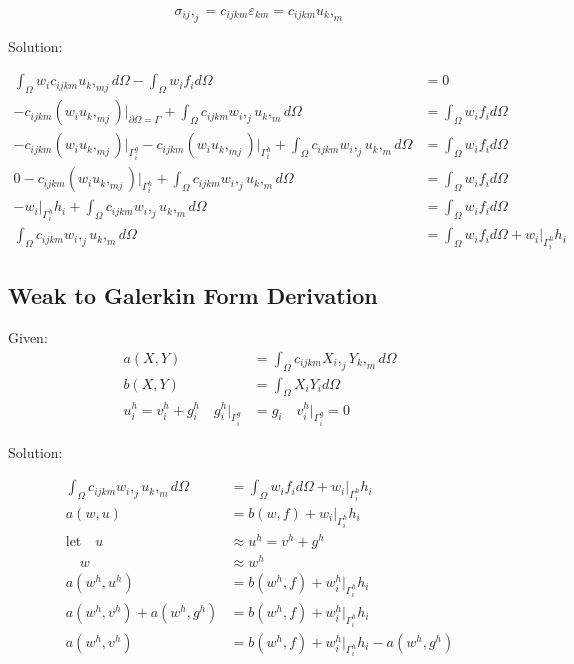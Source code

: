 \documentclass[a4paper, 12pt]{article}
\begin{document}
\begin{equation*}
\sigma_{ij},_{j} = c_{ijkm} \varepsilon_{km} = c_{ijkm} u_{k},_{m}
\end{equation*}

\noindent
Solution:

\begin{align*}
\int_{\Omega} w_{i} c_{ijkm} u_{k},_{mj} d\Omega -
  \int_{\Omega} w_{i} f_{i} d\Omega &= 0 \\
-c_{ijkm}(w_{i} u_{k},_{mj})\Big|_{\partial\Omega = \Gamma}
  + \int_{\Omega} c_{ijkm} w_{i},_{j} u_{k},_{m} d\Omega
  &=\int_{\Omega} w_{i} f_{i} d\Omega  \\
-c_{ijkm}(w_{i} u_{k},_{mj})\Big|_{\Gamma^{g}_{i}}
-c_{ijkm}(w_{i} u_{k},_{mj})\Big|_{\Gamma^{h}_{i}}
  + \int_{\Omega} c_{ijkm} w_{i},_{j} u_{k},_{m} d\Omega
  &=\int_{\Omega} w_{i} f_{i} d\Omega \\
0
 -c_{ijkm}(w_{i} u_{k},_{mj})\Big|_{\Gamma^{h}_{i}}
  + \int_{\Omega} c_{ijkm} w_{i},_{j} u_{k},_{m} d\Omega
  &=\int_{\Omega} w_{i} f_{i} d\Omega \\
-w_{i}\Big|_{\Gamma^{h}_{i}} h_{i}
  + \int_{\Omega} c_{ijkm} w_{i},_{j} u_{k},_{m} d\Omega
  &=\int_{\Omega} w_{i} f_{i} d\Omega \\
\int_{\Omega} c_{ijkm} w_{i},_{j} u_{k},_{m} d\Omega &=
  \int_{\Omega} w_{i} f_{i} d\Omega +
  w_{i}\Big|_{\Gamma^{h}_{i}} h_{i}
\end{align*}

\newpage
\subsection{Weak to Galerkin Form Derivation} \label{sec:GalerkinDer}

Given:
\begin{align*}
a( X, Y ) &=
  \int_{\Omega} c_{ijkm} X_{i},_{j} Y_{k},_{m} d\Omega \\
b( X, Y ) &=
  \int_{\Omega} X_{i} Y_{i} d\Omega \\
u^{h}_{i} =
  v^{h}_{i} + g^{h}_{i}
  \quad
  g^{h}_{i}\Big|_{\Gamma^{g}_{i}} &= g_{i}
  \quad
  v^{h}_{i}\Big|_{\Gamma^{g}_{i}} = 0
\end{align*}

\noindent
Solution:

\begin{align*}
\int_{\Omega} c_{ijkm} w_{i},_{j} u_{k},_{m} d\Omega
 &= \int_{\Omega} w_{i} f_{i} d\Omega
  + w_{i}\Big|_{\Gamma^{h}_{i}} h_{i} \\
a(w, u)
 &= b(w , f)
  + w_{i}\Big|_{\Gamma^{h}_{i}} h_{i}  \\
\text{let} \quad u &\approx u^{h} = v^{h} + g^{h} \\
 \quad w &\approx w^{h} \\
a(w^{h} , u^{h} )
 &= b(w^{h}, f)
  + w^{h}_{i}\Big|_{\Gamma^{h}_{i}} h_{i}  \\
a(w^{h} , v^{h} )
  + a(w^{h} , g^{h} )
 &= b(w^{h}, f)
  + w^{h}_{i}\Big|_{\Gamma^{h}_{i}} h_{i}  \\
a(w^{h} , v^{h})
 &= b(w^{h} , f)
  + w^{h}_{i}\Big|_{\Gamma^{h}_{i}} h_{i}
  - a(w^{h} , g^{h})
\end{align*}
\end{document}
